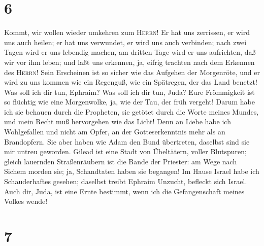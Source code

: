 \hypertarget{section-5}{%
\section{6}\label{section-5}}

 Kommt, wir wollen wieder umkehren zum \textsc{Herrn}! Er
hat uns zerrissen, er wird uns auch heilen; er hat uns verwundet, er
wird uns auch verbinden;  nach zwei Tagen wird er uns
lebendig machen, am dritten Tage wird er uns aufrichten, daß wir vor ihm
leben;  und laßt uns erkennen, ja, eifrig trachten nach
dem Erkennen des \textsc{Herrn}! Sein Erscheinen ist so sicher wie das
Aufgehen der Morgenröte, und er wird zu uns kommen wie ein Regenguß, wie
ein Spätregen, der das Land benetzt!  Was soll ich dir
tun, Ephraim? Was soll ich dir tun, Juda? Eure Frömmigkeit ist so
flüchtig wie eine Morgenwolke, ja, wie der Tau, der früh vergeht!
 Darum habe ich sie behauen durch die Propheten, sie
getötet durch die Worte meines Mundes, und mein Recht muß hervorgehen
wie das Licht!  Denn an Liebe habe ich Wohlgefallen und
nicht am Opfer, an der Gotteserkenntnis mehr als an Brandopfern.
 Sie aber haben wie Adam den Bund übertreten, daselbst
sind sie mir untreu geworden.  Gilead ist eine Stadt von
Übeltätern, voller Blutspuren;  gleich lauernden
Straßenräubern ist die Bande der Priester: am Wege nach Sichem morden
sie; ja, Schandtaten haben sie begangen!  Im Hause Israel
habe ich Schauderhaftes gesehen; daselbst treibt Ephraim Unzucht,
befleckt sich Israel.  Auch dir, Juda, ist eine Ernte
bestimmt, wenn ich die Gefangenschaft meines Volkes wende!

\hypertarget{section-6}{%
\section{7}\label{section-6}}

